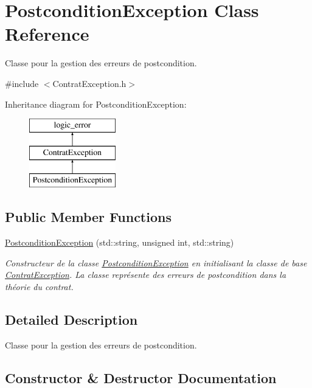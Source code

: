 \hypertarget{classPostconditionException}{}\section{Postcondition\+Exception Class Reference}
\label{classPostconditionException}


Classe pour la gestion des erreurs de postcondition.  




{\ttfamily \#include $<$Contrat\+Exception.\+h$>$}

Inheritance diagram for Postcondition\+Exception\+:\begin{figure}[H]
\begin{center}
\leavevmode
\includegraphics[height=3.000000cm]{classPostconditionException}
\end{center}
\end{figure}
\subsection*{Public Member Functions}
\begin{DoxyCompactItemize}
\item 
\hyperlink{classPostconditionException_acc95ea17c4302b996261b7201d2cf6c4}{Postcondition\+Exception} (std\+::string, unsigned int, std\+::string)
\begin{DoxyCompactList}\small\item\em Constructeur de la classe \hyperlink{classPostconditionException}{Postcondition\+Exception} en initialisant la classe de base \hyperlink{classContratException}{Contrat\+Exception}. La classe représente des erreurs de postcondition dans la théorie du contrat. \end{DoxyCompactList}\end{DoxyCompactItemize}


\subsection{Detailed Description}
Classe pour la gestion des erreurs de postcondition. 

\subsection{Constructor \& Destructor Documentation}
\mbox{\label{classPostconditionException_acc95ea17c4302b996261b7201d2cf6c4}} 
